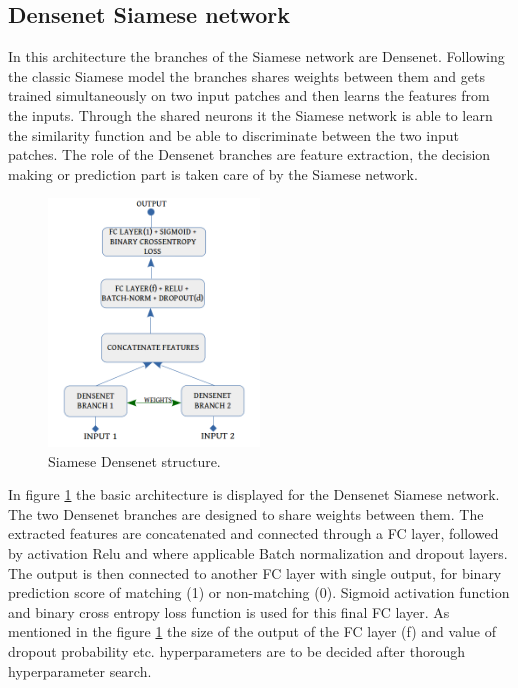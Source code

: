 \newpage
\subsection{Densenet Siamese network}

In this architecture the branches of the Siamese network are Densenet. Following the classic Siamese model the branches shares weights between them and gets trained simultaneously on two input patches and then learns the features from the inputs.
Through the shared neurons it the Siamese network is able to learn the similarity function and be able to discriminate between the two input patches. The role of the Densenet branches are feature extraction, the decision making or prediction 
part is taken care of by the Siamese network.

\begin{figure}[ht]
\centering
\includegraphics[width=0.5\textwidth]{images/densenet/siamese_densenet_structure.png}
\caption{Siamese Densenet structure.}
\label{fig:dn_siamese}
\end{figure}

In figure \ref{fig:dn_siamese} the basic architecture is displayed for the Densenet Siamese network. The two Densenet branches are designed to share weights between them. The extracted features are concatenated and connected through a
FC layer, followed by activation Relu and where applicable Batch normalization and dropout layers. The output is then connected to another FC layer with single output, for binary prediction score of matching (1) or non-matching (0). 
Sigmoid activation function and binary cross entropy loss function is used for this final FC layer. As mentioned in the figure \ref{fig:dn_siamese} the size of the output of the FC layer (f) and value of dropout probability etc. hyperparameters
are to be decided after thorough hyperparameter search.

